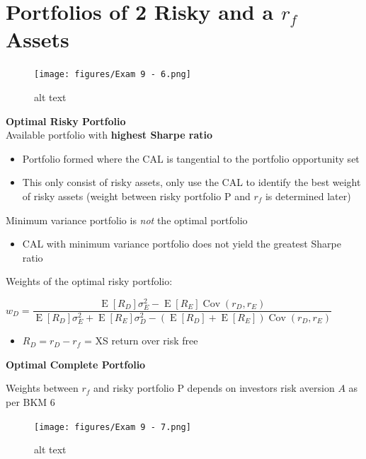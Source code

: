 \documentclass[]{book}
\providecommand{\tightlist}{%
  \setlength{\itemsep}{0pt}\setlength{\parskip}{0pt}}
\theoremstyle{definition}
\theoremstyle{definition}
\theoremstyle{remark}
\begin{document}
\section{\texorpdfstring{Portfolios of 2 Risky and a \(r_f\)
Assets}{Portfolios of 2 Risky and a r\_f Assets}}\label{portfolios-of-2-risky-and-a-r_f-assets}

\begin{figure}[htbp]
\centering
\texttt{[image: figures/Exam 9 - 6.png]}
\caption{alt text}
\end{figure}

\textbf{Optimal Risky Portfolio}\\
Available portfolio with \textbf{highest Sharpe ratio}

\begin{itemize}
\item
  Portfolio formed where the CAL is tangential to the portfolio
  opportunity set
\item
  This only consist of risky assets, only use the CAL to identify the
  best weight of risky assets (weight between risky portfolio P and
  \(r_f\) is determined later)
\end{itemize}

Minimum variance portfolio is \emph{not} the optimal portfolio

\begin{itemize}
\tightlist
\item
  CAL with minimum variance portfolio does not yield the greatest Sharpe
  ratio
\end{itemize}

Weights of the optimal risky portfolio:

\(w_D = \dfrac{\operatorname{E}[R_D]\sigma^2_E - \operatorname{E}[R_E] \operatorname{Cov}(r_D, r_E)}{\operatorname{E}[R_D]\sigma^2_E + \operatorname{E}[R_E]\sigma^2_D - \left( \operatorname{E}[R_D] + \operatorname{E}[R_E] \right) \operatorname{Cov}(r_D, r_E)}\)

\begin{itemize}
\tightlist
\item
  \(R_D = r_D - r_f\) = XS return over risk free
\end{itemize}

\textbf{Optimal Complete Portfolio}

Weights between \(r_f\) and risky portfolio P depends on investors risk
aversion \(A\) as per BKM 6

\begin{figure}[htbp]
\centering
\texttt{[image: figures/Exam 9 - 7.png]}
\caption{alt text}
\end{figure}
\end{document}
